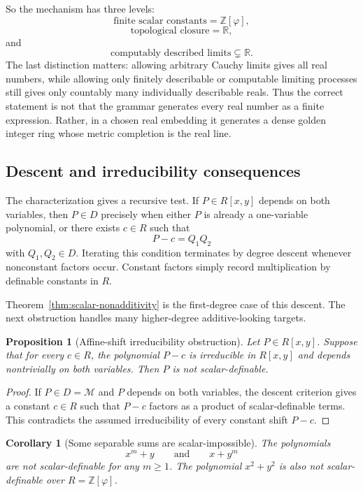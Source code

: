 \documentclass[11pt]{article}
\newtheorem{corollary}[definition]{Corollary}
\newtheorem{proposition}[definition]{Proposition}
\newcommand{\ph}{\varphi}
\newcommand{\Z}{\mathbb{Z}}
\newcommand{\R}{\mathbb{R}}
\begin{document}
So the mechanism has three levels:
\[
    \text{finite scalar constants}=\Z[\ph],
\]
\[
    \text{topological closure}=\R,
\]
and
\[
    \text{computably described limits}\subsetneq\R.
\]
The last distinction matters: allowing arbitrary Cauchy limits gives all real numbers, while allowing only finitely describable or computable limiting processes still gives only countably many individually describable reals.  Thus the correct statement is not that the grammar generates every real number as a finite expression.  Rather, in a chosen real embedding it generates a dense golden integer ring whose metric completion is the real line.

\subsection{Descent and irreducibility consequences}

The characterization gives a recursive test.  If $P\in R[x,y]$ depends on both variables, then $P\in D$ precisely when either $P$ is already a one-variable polynomial, or there exists $c\in R$ such that
\[
    P-c=Q_1Q_2
\]
with $Q_1,Q_2\in D$.  Iterating this condition terminates by degree descent whenever nonconstant factors occur.  Constant factors simply record multiplication by definable constants in $R$.

Theorem~\ref{thm:scalar-nonadditivity} is the first-degree case of this descent.  The next obstruction handles many higher-degree additive-looking targets.

\begin{proposition}[Affine-shift irreducibility obstruction]\label{prop:irreducibility-obstruction}
Let $P\in R[x,y]$.  Suppose that for every $c\in R$, the polynomial $P-c$ is irreducible in $R[x,y]$ and depends nontrivially on both variables.  Then $P$ is not scalar-definable.
\end{proposition}

\begin{proof}
If $P\in D=\mathcal M$ and $P$ depends on both variables, the descent criterion gives a constant $c\in R$ such that $P-c$ factors as a product of scalar-definable terms.  This contradicts the assumed irreducibility of every constant shift $P-c$.
\end{proof}

\begin{corollary}[Some separable sums are scalar-impossible]\label{cor:separable-sums}
The polynomials
\[
    x^m+y\qquad\text{and}\qquad x+y^m
\]
are not scalar-definable for any $m\ge 1$.  The polynomial $x^2+y^2$ is also not scalar-definable over $R=\Z[\ph]$.
\end{corollary}
\end{document}
